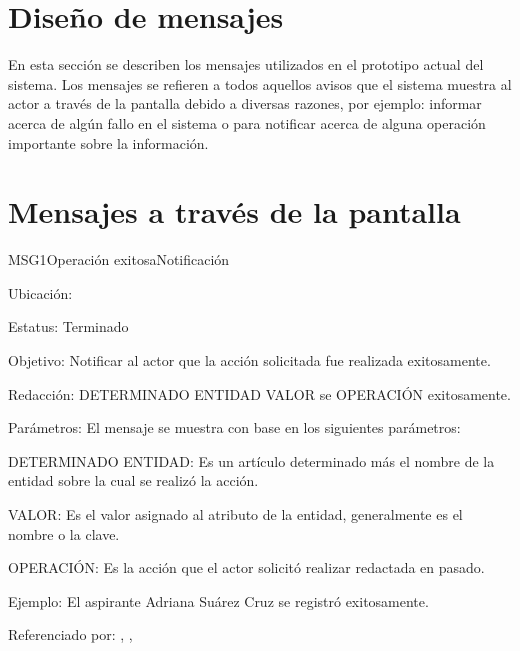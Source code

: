 \newpage
\section{Diseño de mensajes}

	En esta sección se describen los mensajes utilizados en el prototipo actual del sistema. Los mensajes se refieren a todos
	aquellos avisos que el sistema muestra al actor a través de la pantalla debido a diversas
	razones, por ejemplo: informar acerca de algún fallo en el sistema o para notificar acerca de alguna operación importante sobre
	la información.

\section{Mensajes a través de la pantalla}

\begin{mensaje}{MSG1}{Operación exitosa}{Notificación}
	\item[Ubicación:] \msjSuperior
	\item[Estatus:] Terminado
	\item[Objetivo:] Notificar al actor que la acción solicitada fue realizada exitosamente.
	\item[Redacción:] DETERMINADO ENTIDAD VALOR se OPERACIÓN exitosamente.
	\item[Parámetros:] El mensaje se muestra con base en los siguientes parámetros:
	\begin{Citemize} 
		\item DETERMINADO ENTIDAD: Es un artículo determinado más el nombre de la entidad sobre la cual se realizó la acción.
		\item VALOR: Es el valor asignado al atributo de la entidad, generalmente es el nombre o la clave.
		\item OPERACIÓN: Es la acción que el actor solicitó realizar redactada en pasado.
	\end{Citemize}
	\item[Ejemplo:] El aspirante Adriana Suárez Cruz se registró exitosamente.

	\item[Referenciado por:] 
		,
		,
\end{mensaje}

